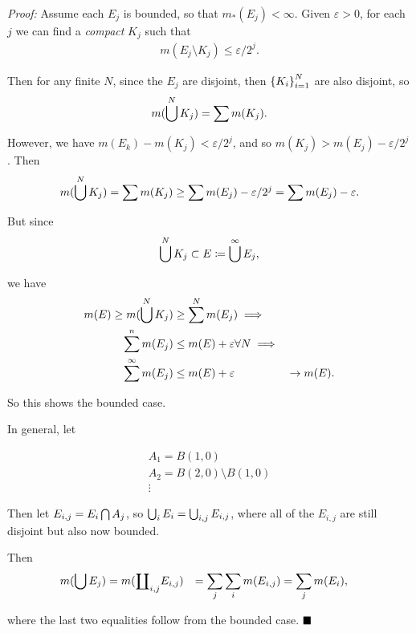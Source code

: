 \emph{Proof:} Assume each \(E_j\) is bounded, so that
\(m_*(E_j) < \infty\). Given \(\varepsilon > 0\), for each \(j\) we can
find a \emph{compact} \(K_j\) such that
\begin{align*}
m(E_j \setminus K_j) \leq \varepsilon / 2^j
.\end{align*}

Then for any finite \(N\), since the \(E_j\) are disjoint, then
\(\left\{{K_i}\right\}_{i=1}^N\) are also disjoint, so
\begin{align*}
m(\bigcup^N K_j) = \sum m(K_j)
.\end{align*}

However, we have \(m(E_k) - m(K_j) < \varepsilon / 2^j\), and so
\(m(K_j) > m(E_j) - \varepsilon / 2^j\). Then
\begin{align*}
m(\bigcup^N K_j) = \sum m(K_j) \geq \sum m(E_j) - \varepsilon / 2^j = \sum m(E_j) - \varepsilon.
\end{align*}

But since
\begin{align*}
\bigcup^N K_j \subset E \coloneqq \bigcup^\infty E_j
,\end{align*}

we have \begin{align*}
m(E) \geq m(\bigcup^N K_j) &\geq \sum^N m(E_j) \implies \\
\sum^n m(E_j) &\leq m(E) + \varepsilon \forall N \implies \\
\sum^\infty m(E_j) &\leq m(E) + \varepsilon 
&\to m(E)
.\end{align*}

So this shows the bounded case.

In general, let

\begin{align*}
A_1 = B(1, 0) \\
A_2 = B(2, 0) \setminus B(1, 0) \\
\vdots
\end{align*}

Then let \(E_{i, j} = E_i \bigcap A_j\), so
\(\bigcup_i E_i = \bigcup_{i, j} E_{i, j}\), where all of the \(E_{i, j}\)
are still disjoint but also now bounded.

Then \begin{align*}
m(\bigcup E_j) 
&= m({\coprod}_{i, j} E_{i, j}) 
&= \sum_j \sum_i m(E_{i, j}) 
&= \sum_j m(E_i)
,\end{align*}

where the last two equalities follow from the bounded case. \(\qed\)

